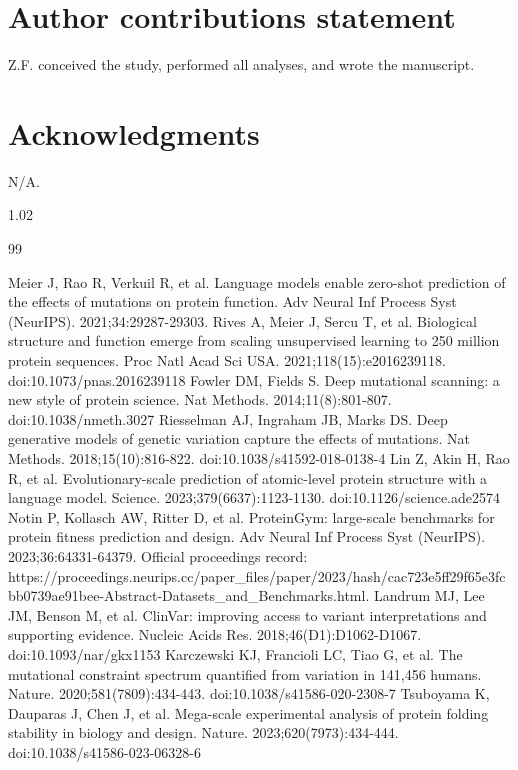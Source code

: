 \documentclass[12pt]{article}
\begin{document}
\section*{Author contributions statement}
Z.F. conceived the study, performed all analyses, and wrote the manuscript.

\section*{Acknowledgments}
N/A.

\endgroup
\begin{spacing}{1.02}
\begin{thebibliography}{99}
\small
\setlength{\itemsep}{5pt}
\setlength{\parskip}{0pt}
\raggedright
{} Meier J, Rao R, Verkuil R, et al. Language models enable zero-shot prediction of the effects of mutations on protein function. Adv Neural Inf Process Syst (NeurIPS). 2021;34:29287-29303.
 Rives A, Meier J, Sercu T, et al. Biological structure and function emerge from scaling unsupervised learning to 250 million protein sequences. Proc Natl Acad Sci USA. 2021;118(15):e2016239118. doi:10.1073/pnas.2016239118
 Fowler DM, Fields S. Deep mutational scanning: a new style of protein science. Nat Methods. 2014;11(8):801-807. doi:10.1038/nmeth.3027
 Riesselman AJ, Ingraham JB, Marks DS. Deep generative models of genetic variation capture the effects of mutations. Nat Methods. 2018;15(10):816-822. doi:10.1038/s41592-018-0138-4
 Lin Z, Akin H, Rao R, et al. Evolutionary-scale prediction of atomic-level protein structure with a language model. Science. 2023;379(6637):1123-1130. doi:10.1126/science.ade2574
 Notin P, Kollasch AW, Ritter D, et al. ProteinGym: large-scale benchmarks for protein fitness prediction and design. Adv Neural Inf Process Syst (NeurIPS). 2023;36:64331-64379. Official proceedings record: https://proceedings.neurips.cc/paper\_files/paper/2023/hash/cac723e5ff29f65e3fcbb0739ae91bee-Abstract-Datasets\_and\_Benchmarks.html.
 Landrum MJ, Lee JM, Benson M, et al. ClinVar: improving access to variant interpretations and supporting evidence. Nucleic Acids Res. 2018;46(D1):D1062-D1067. doi:10.1093/nar/gkx1153
 Karczewski KJ, Francioli LC, Tiao G, et al. The mutational constraint spectrum quantified from variation in 141,456 humans. Nature. 2020;581(7809):434-443. doi:10.1038/s41586-020-2308-7
 Tsuboyama K, Dauparas J, Chen J, et al. Mega-scale experimental analysis of protein folding stability in biology and design. Nature. 2023;620(7973):434-444. doi:10.1038/s41586-023-06328-6

\end{thebibliography}
\end{spacing}
\end{document}
